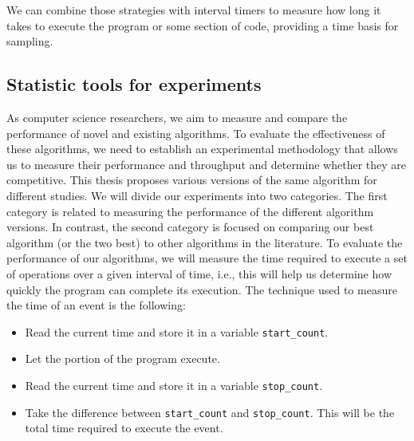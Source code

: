 We can combine those strategies with interval timers to measure how long it takes to execute the program or some section of code, providing a time basis for sampling.




\subsection{\label{subsec:statistics}Statistic tools for experiments}

As computer science researchers, we aim to measure and compare the performance of novel and existing algorithms. To evaluate the effectiveness of these algorithms, we need to establish an experimental methodology that allows us to measure their performance and throughput and determine whether they are competitive. This thesis proposes various versions of the same algorithm for different studies. We will divide our experiments into two categories. The first category is related to measuring the performance of the different algorithm versions.
In contrast, the second category is focused on comparing our best algorithm (or the two best) to other algorithms in the literature. To evaluate the performance of our algorithms, we will measure the time required to execute a set of operations over a given interval of time, i.e., this will help us determine how quickly the program can complete its execution. The technique used to measure the time of an event is the following:

\begin{itemize}
\item Read the current time and store it in a variable \texttt{start\_count}.
\item Let the portion of the program execute.
\item Read the current time and store it in a variable \texttt{stop\_count}.
\item Take the difference between \texttt{start\_count} and \texttt{stop\_count}. This will be the
total time required to execute the event.
\end{itemize}

